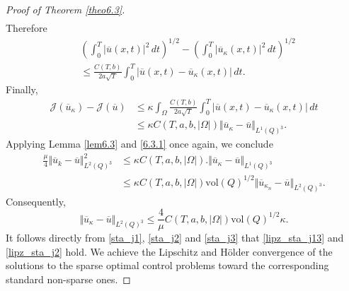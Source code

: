 \documentclass[10pt,a4paper]{amsart}
\begin{document}
\begin{proof}[Proof of Theorem \ref{theo6.3}]
\begin{align*}
		\end{align*}
		Therefore
		\begin{align*}
			&\left( \int_0^T \vert \overline{u}(x,t) \vert^2 \, dt\right)^{1/2} - \left( \int_0^T \vert \overline{u}_{\kappa}(x,t) \vert^2 \, dt\right)^{1/2} \\
			&\leq \frac{C(T,b)}{2a\sqrt{T}} \int_0^T \vert \overline{u}(x,t) - \overline{u}_{\kappa}(x,t) \vert \, dt.
		\end{align*}
		Finally,
		\begin{align*}
			\mathcal{J}({\overline{u}}_{\kappa}) - \mathcal{J}(\overline{u}) &\leq \kappa \int_\Omega \frac{C(T,b)}{2a\sqrt{T}} \int_0^T \vert \overline{u}(x,t) - \overline{u}_{\kappa}(x,t) \vert \, dt \\
			&\leq \kappa C(T,a,b,\vert\Omega\vert) \Vert \overline{u}_{\kappa} - \overline{u} \Vert_{L^1(Q)^3}.
		\end{align*}
		Applying Lemma \ref{lem6.3} and \eqref{6.3.1} once again, we conclude
		\begin{align*}
			\frac{\mu}{4} \Vert \overline{u}_k - \overline{u} \Vert_{L^2(Q)^3}^2 &\leq \kappa C(T,a,b,\vert\Omega\vert).\Vert \overline{u}_{\kappa} - \overline{u}\Vert_{L^1(Q)^3} \\
			&\leq \kappa C(T,a,b,\vert\Omega\vert) \text{vol}(Q)^{1/2} \Vert \overline{u}_{\kappa_n}- \overline{u} \Vert_{L^2(Q)^3}.
		\end{align*}
		Consequently,
		\begin{equation} \label{sta_j3}
			\Vert \overline{u}_{\kappa} - \overline{u} \Vert_{L^2(Q)^3} \leq \frac{4}{\mu}C(T,a,b,\vert\Omega\vert) \text{vol}(Q)^{1/2} \kappa.
		\end{equation}
		It follows directly from \eqref{sta_j1}, \eqref{sta_j2} and \eqref{sta_j3} that \eqref{lipz_sta_j13} and \eqref{lipz_sta_j2} hold. We achieve the Lipschitz and H\"older convergence of the solutions to the sparse optimal control problems toward the corresponding standard non-sparse ones.
	\end{proof}
\end{document}
